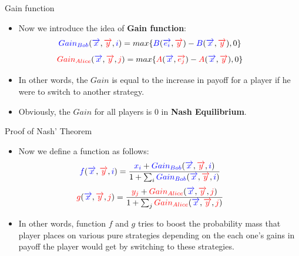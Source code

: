 \documentclass{beamer}
\begin{document}
\begin{frame}[fragile]{Gain function}
	\begin{itemize}[<+->]
		\item Now we introduce the idea of \textbf{Gain function}:\\
		\begin{equation}
		{\color{blue}Gain_{Bob}} ({\color{blue}\overrightarrow{x}}, {\color{red}\overrightarrow{y}}, {\color{blue}i}) = max\{{\color{blue}B}({\color{blue}\overrightarrow{e_i}}, {\color{red}\overrightarrow{y}})-{\color{blue}B}({\color{blue}\overrightarrow{x}}, {\color{red}\overrightarrow{y}}), 0\} \ \  \ \ \ \ \ \nonumber
		\end{equation}
		\begin{equation}
		{\color{red}Gain_{Alice}} ({\color{blue}\overrightarrow{x}}, {\color{red}\overrightarrow{y}}, {\color{red}j}) = max\{{\color{red}A}({\color{blue}\overrightarrow{x}}, {\color{red}\overrightarrow{e_j}})-{\color{red}A}({\color{blue}\overrightarrow{x}}, {\color{red}\overrightarrow{y}}), 0\} \ \  \ \ \ \ \ \nonumber
		\end{equation}
		\item In other words, the $Gain$ is equal to the increase in payoff for a player if he were to switch to another strategy.
		\item Obviously, the $Gain$ for all players is 0 in \textbf{Nash Equilibrium}.
	\end{itemize}
\end{frame}

\begin{frame}[fragile]{Proof of Nash' Theorem}
	\begin{itemize}[<+->]
		\item Now we define a function as follows:
		 \begin{equation}
		 {\color{blue}f}({\color{blue}\overrightarrow{x}}, {\color{red}\overrightarrow{y}}, {\color{blue}i}) = \frac{{\color{blue}x_i} + {\color{blue}Gain_{Bob}} ({\color{blue}\overrightarrow{x}}, {\color{red}\overrightarrow{y}}, {\color{blue}i})}{1 + \sum_i{\color{blue}Gain_{Bob}} ({\color{blue}\overrightarrow{x}}, {\color{red}\overrightarrow{y}}, {\color{blue}i})}\ \  \ \ \ \ \ \nonumber
		 \end{equation}
		 \begin{equation}
		 {\color{red}g}({\color{blue}\overrightarrow{x}}, {\color{red}\overrightarrow{y}}, {\color{red}j}) = \frac{{\color{red}y_j} + {\color{red}Gain_{Alice}} ({\color{blue}\overrightarrow{x}}, {\color{red}\overrightarrow{y}}, {\color{red}j})}{1 + \sum_j{\color{red}Gain_{Alice}} ({\color{blue}\overrightarrow{x}}, {\color{red}\overrightarrow{y}}, {\color{red}j})}\ \  \ \ \ \ \ \nonumber
		 \end{equation}
		\item In other words, function $f$ and $g$ tries to boost the probability mass that player places on various pure strategies
		depending on the each one's gains in payoff the player would get by switching to these strategies.
	\end{itemize}
\end{frame}
\end{document}
